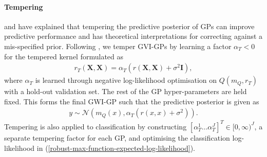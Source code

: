 \documentclass{article}
\numberwithin{equation}{section}
\begin{document}
\paragraph{Tempering}\cite{wild2022generalized} and \cite{adlam2020cold} have explained that tempering the predictive posterior of GPs can improve predictive performance and has theoretical interpretations for correcting against a mis-specified prior. Following \cite{wild2022generalized}, we temper GVI-GPs by learning a factor $\alpha_T < 0$ for the tempered kernel formulated as
\begin{align}
    r_T(\mathbf{X}, \mathbf{X}) = \alpha_T \left(r(\mathbf{X}, \mathbf{X})+\sigma^2 \mathbf{I}\right),
\end{align}
where $\alpha_T$ is learned through negative log-likelihood optimisation on $Q\left(m_Q, r_T\right)$ with a hold-out validation set. 
The rest of the GP hyper-parameters are held fixed. 
This forms the final GWI-GP such that the predictive posterior is given as
\begin{align}
    y \sim \mathcal{N}\left(m_Q(x), \alpha_T \left( r(x, x) + \sigma^2\right) \right).
\end{align}
Tempering is also applied to classification by constructing $\left[\alpha_T^1 \dots \alpha_T^J\right]^T \in [0, \infty)^J$, a separate tempering factor for each GP, and optimising the classification log-likelihood in (\ref{robust-max-function-expected-log-likelihood}).
\end{document}
